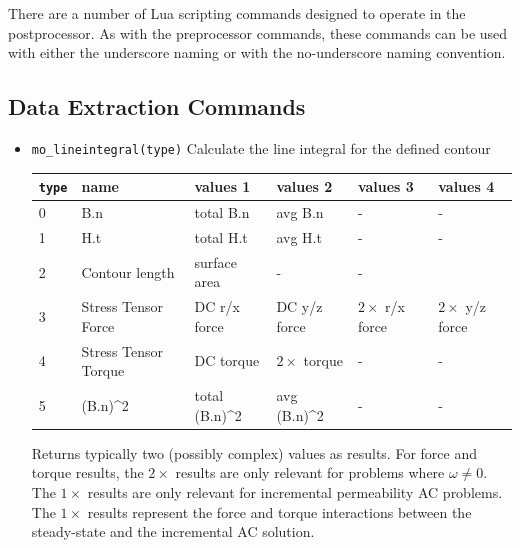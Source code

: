 There are a number of Lua scripting commands designed to operate in
the postprocessor.  As with the preprocessor commands, these
commands can be used with either the underscore naming or with the
no-underscore naming convention.

\subsection{Data Extraction Commands}

\begin{itemize}
\item{\tt mo\_lineintegral(type)} Calculate the line integral for the defined contour
\begin{small}\begin{center}
\begin{tabular}{llllll}\hline
 {\tt type} & name & values 1 & values 2 & values 3 & values 4 \\  \hline
 0 & B.n & total B.n & avg B.n & - & -\\
 1 & H.t & total H.t & avg H.t & - & - \\
 2 & Contour length & surface area & - & -\\
 3 & Stress Tensor Force & DC r/x force & DC y/z force & $2\times$ r/x force & $2\times$ y/z force \\
 4 & Stress Tensor Torque& DC torque & $2\times$ torque & - & - \\
 5 & (B.n)\^{}2 & total (B.n)\^{}2 & avg (B.n)\^{}2 & - & - \\ \hline
\end{tabular}
\end{center}
\end{small}
Returns typically two (possibly complex) values as results. For force
and torque results, the $2\times$ results are only relevant for
problems where $\omega \neq 0$.  The $1\times$ results are only relevant
for incremental permeability AC problems.  The $1\times$ results represent
the force and torque interactions between the steady-state and the
incremental AC solution.


\end{itemize}
